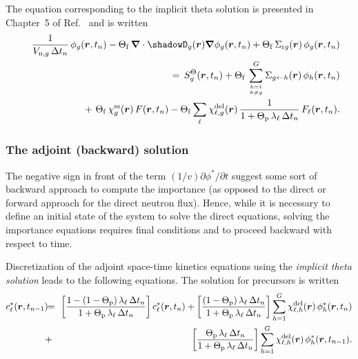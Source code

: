 The equation corresponding to the implicit theta solution is presented in Chapter~5 of Ref.~ and is written
\begin{eqnarray}
\nonumber&~&{1\over V_{{\rm n},g}\, \Delta t_n} \, \phi_g(\bff(r),t_n) - \Theta_{\rm f} \, \bff(\nabla) \cdot \shadowD_g(\bff(r)) \bff(\nabla) \phi_g(\bff(r),t_n) + \Theta_{\rm f} \, \Sigma_{{\rm r}g}(\bff(r)) \, \phi_g(\bff(r),t_n) \\
\nonumber&~& \ \ \ \ \ \ = \, S_g^\Theta(\bff(r),t_n)+ \Theta_{\rm f} \, \sum_{{h=1} \atop {h \not= g}}^G \Sigma_{g \leftarrow h}(\bff(r)) \, \phi_h(\bff(r),t_n)\\
&~& \ \ \ \ \ \ + \ \Theta_{\rm f} \, \chi_g^{\rm ss}(\bff(r)) \, F(\bff(r),t_{n}) -\Theta_{\rm f} \sum_\ell \chi_{\ell,g}^{\rm del}(\bff(r)) \, {1 \over 1+\Theta_{\rm p} \, \lambda_\ell\, \Delta t_n} \, F_\ell(\bff(r),t_{n}) .
\label{eq:eq_inikin_10}
\end{eqnarray}

\subsubsection{The adjoint (backward) solution}

The negative sign in front of the term $(1/v) \partial\phi^*/\partial t$ suggest some sort of backward approach to compute the importance (as opposed to the direct
or forward approach for the direct neutron flux). Hence, while it is necessary to define an initial state of the system to solve the direct equations, solving the
importance equations requires final conditions and to proceed backward with respect to time.

\vskip 0.08cm

Discretization of the adjoint space-time kinetics equations using the {\sl implicit theta solution} leads to the following equations. The solution for precursors is written
\begin{eqnarray}
\nonumber c^*_{\ell}(\bff(r),t_{n-1})\negthinspace\negthinspace&=&\negthinspace\negthinspace \left[ {1-(1- \Theta_{\rm p}) \, \lambda_\ell \, \Delta t_n \over 1+ \Theta_{\rm p}\, \lambda_\ell \, \Delta t_n}\right] c^*_{\ell}(\bff(r),t_{n}) + \left[{(1- \Theta_{\rm p}) \, \lambda_\ell \, \Delta t_n\over 1+ \Theta_{\rm p}\, \lambda_\ell \, \Delta t_n } \right] \sum_{h=1}^G \chi_{\ell,h}^{\rm del}(\bff(r)) \, \phi^*_h(\bff(r),t_{n}) \\
&+&\negthinspace\negthinspace \left[{ \Theta_{\rm p} \, \lambda_\ell \,\Delta t_n\over 1+ \Theta_{\rm p}\, \lambda_\ell \, \Delta t_n} \right]\sum_{h=1}^G \chi_{\ell,h}^{\rm del}(\bff(r)) \, \phi^*_h(\bff(r),t_{n-1}) .
\label{eq:eq_inikin_11}
\end{eqnarray}

